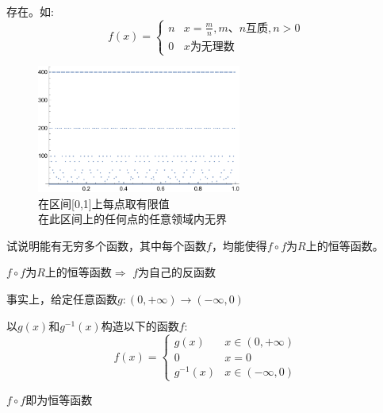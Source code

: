 \begin{solution}
    
    存在。如:
    \begin{equation}
        f(x) = 
        \begin{cases}
            n & x=\frac{m}{n},m\mbox{、}n\mbox{互质},n>0\\ 
            0 & x\mbox{为无理数}
        \end{cases}
    \end{equation}

    \begin{figure}[htbp]
        \centering
        \includegraphics[width=0.6\textwidth]{../image/狄利克雷函数}
        \caption{在区间[0,1]上每点取有限值\\ 在此区间上的任何点的任意领域内无界}
    \end{figure}
\end{solution}

\begin{exercise}
    试说明能有无穷多个函数，其中每个函数$f$，均能使得$f\circ f$为$R$上的恒等函数。
\end{exercise}

\begin{solution}
    $f\circ f$为$R$上的恒等函数$\Longrightarrow $ $f$为自己的反函数

    事实上，给定任意函数$g:(0,+\infty) \to (-\infty,0)$

    以$g(x)\mbox{和}g^{-1}(x)$构造以下的函数$f$:
    \begin{equation*}
        f(x)
        = \begin{cases}
            g(x) & x\in (0,+\infty)\\ 
            0 & x=0 \\ 
            g^{-1}(x) & x \in (-\infty,0)
        \end{cases}
    \end{equation*}

    $f\circ f$即为恒等函数
\end{solution}

